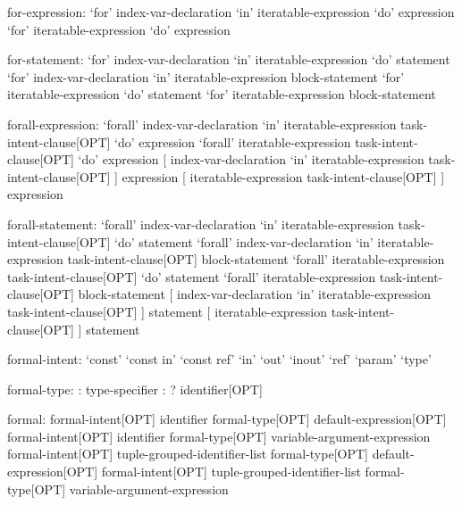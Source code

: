 \begin{syntax}
for-expression:
  `for' index-var-declaration `in' iteratable-expression `do' expression
  `for' iteratable-expression `do' expression
\end{syntax}

\begin{syntax}
for-statement:
  `for' index-var-declaration `in' iteratable-expression `do' statement
  `for' index-var-declaration `in' iteratable-expression block-statement
  `for' iteratable-expression `do' statement
  `for' iteratable-expression block-statement
\end{syntax}

\begin{syntax}
forall-expression:
  `forall' index-var-declaration `in' iteratable-expression task-intent-clause[OPT] `do' expression
  `forall' iteratable-expression task-intent-clause[OPT] `do' expression
  [ index-var-declaration `in' iteratable-expression task-intent-clause[OPT] ] expression
  [ iteratable-expression task-intent-clause[OPT] ] expression
\end{syntax}

\begin{syntax}
forall-statement:
  `forall' index-var-declaration `in' iteratable-expression task-intent-clause[OPT] `do' statement
  `forall' index-var-declaration `in' iteratable-expression task-intent-clause[OPT] block-statement
  `forall' iteratable-expression task-intent-clause[OPT] `do' statement
  `forall' iteratable-expression task-intent-clause[OPT] block-statement
  [ index-var-declaration `in' iteratable-expression task-intent-clause[OPT] ] statement
  [ iteratable-expression task-intent-clause[OPT] ] statement
\end{syntax}

\begin{syntax}
formal-intent:
  `const'
  `const in'
  `const ref'
  `in'
  `out'
  `inout'
  `ref'
  `param'
  `type'
\end{syntax}

\begin{syntax}
formal-type:
  : type-specifier
  : ? identifier[OPT]
\end{syntax}

\begin{syntax}
formal:
  formal-intent[OPT] identifier formal-type[OPT] default-expression[OPT]
  formal-intent[OPT] identifier formal-type[OPT] variable-argument-expression
  formal-intent[OPT] tuple-grouped-identifier-list formal-type[OPT] default-expression[OPT]
  formal-intent[OPT] tuple-grouped-identifier-list formal-type[OPT] variable-argument-expression
\end{syntax}

